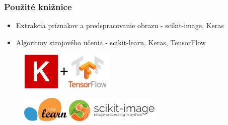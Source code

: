 \documentclass[10pt,xcolor=pdflatex]{beamer}
\begin{document}
\begin{frame}\frametitle{Použité knižnice}
    \begin{itemize}
        \item Extrakcia príznakov a predspracovanie obrazu - scikit-image, Keras
        \item Algoritmy strojového učenia - scikit-learn, Keras, TensorFlow
    \end{itemize}

    \vspace{0.4cm}

    \begin{figure}[H]
        \centering
        \includegraphics[width=0.4\textwidth]{img/keras-tensorflow}
    \end{figure}

    \begin{figure}[H]
        \centering
        \includegraphics[width=0.2\textwidth]{img/scikit-learn-logo}
        \qquad
        \includegraphics[width=0.4\textwidth]{img/scikit-image-logo}
    \end{figure}

\end{frame}
\end{document}
